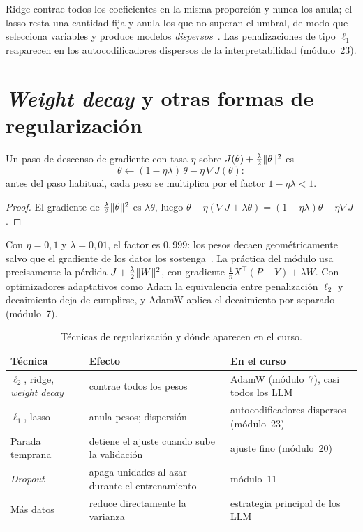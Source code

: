 Ridge contrae todos los coeficientes en la misma proporción y nunca los anula; el lasso resta una cantidad fija y anula los que no superan el umbral, de modo que selecciona variables y produce modelos \emph{dispersos}~\cite[§3.4.2--3.4.3]{esl}. Las penalizaciones de tipo $\ell_1$ reaparecen en los autocodificadores dispersos de la interpretabilidad (módulo~23).

\section{\emph{Weight decay} y otras formas de regularización}

\begin{proposicion}\label{prop:weight-decay}
Un paso de descenso de gradiente con tasa $\eta$ sobre $J(\theta)+\frac{\lambda}{2}\lVert\theta\rVert^{2}$ es
\[
\theta\leftarrow(1-\eta\lambda)\,\theta-\eta\,\nabla J(\theta):
\]
antes del paso habitual, cada peso se multiplica por el factor $1-\eta\lambda<1$.
\end{proposicion}

\begin{proof}
El gradiente de $\frac{\lambda}{2}\lVert\theta\rVert^{2}$ es $\lambda\theta$, luego $\theta-\eta(\nabla J+\lambda\theta)=(1-\eta\lambda)\theta-\eta\nabla J$.
\end{proof}

Con $\eta=0{,}1$ y $\lambda=0{,}01$, el factor es $0{,}999$: los pesos decaen geométricamente salvo que el gradiente de los datos los sostenga~\cite[§3.7.1]{d2l}. La práctica del módulo usa precisamente la pérdida $J+\frac{\lambda}{2}\lVert W\rVert^{2}$, con gradiente $\frac1nX^{\top}(P-Y)+\lambda W$. Con optimizadores adaptativos como Adam la equivalencia entre penalización $\ell_2$ y decaimiento deja de cumplirse, y AdamW aplica el decaimiento por separado~\cite{adamw} (módulo~7).

\begin{table}[h]
\centering\small
\caption{Técnicas de regularización y dónde aparecen en el curso.}\label{tab:regularizacion}
\begin{tabular}{@{}>{\raggedright\arraybackslash}p{}>{\raggedright\arraybackslash}p{}>{\raggedright\arraybackslash}p{}@{}}
\toprule
Técnica & Efecto & En el curso \\
\midrule
$\ell_2$, ridge, \emph{weight decay} & contrae todos los pesos & AdamW (módulo~7), casi todos los LLM \\
$\ell_1$, lasso & anula pesos; dispersión & autocodificadores dispersos (módulo~23) \\
Parada temprana & detiene el ajuste cuando sube la validación & ajuste fino (módulo~20) \\
\emph{Dropout} & apaga unidades al azar durante el entrenamiento & módulo~11 \\
Más datos & reduce directamente la varianza & estrategia principal de los LLM \\
\bottomrule
\end{tabular}
\end{table}

